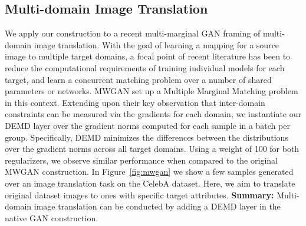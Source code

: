 \subsection{Multi-domain Image Translation}
We apply our construction to a recent multi-marginal GAN framing of multi-domain image translation.
With the goal of learning a mapping for a source image to multiple target domains, a focal point of recent literature has been to reduce the computational requirements of training individual models for each target, and learn a concurrent matching problem over a number of shared parameters or networks. MWGAN \citep{cao2019multi} set up a Multiple Marginal Matching problem in this context.
Extending upon their key observation that inter-domain constraints can be measured via the gradients for each domain,
we instantiate our DEMD layer over the gradient norms computed for each sample in a batch per group.
Specifically, DEMD minimizes the differences between the distributions over the gradient norms across all target domains.
Using a weight of 100 for both regularizers,
we observe similar performance when compared 
to the original MWGAN construction.
In Figure~\ref{fig:mwgan} we show a few samples generated over an image translation task on the CelebA dataset.
Here, we aim to translate original dataset images to ones with specific target attributes.
\textbf{Summary:} Multi-domain image translation can be conducted by adding a DEMD layer in the native GAN construction. 

